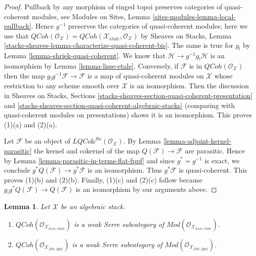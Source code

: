 \documentclass{stacks-project}
\theoremstyle{plain}
\newtheorem{lemma}[subsection]{Lemma}
\theoremstyle{definition}
\theoremstyle{remark}
\numberwithin{equation}{subsection}
\def\etale{{\acute{e}tale}}
\def\QCoh{\mathit{QCoh}}
\begin{document}
\begin{proof}
Pullback by any morphism of ringed topoi preserves categories of quasi-coherent
modules, see
Modules on Sites, Lemma \ref{sites-modules-lemma-local-pullback}.
Hence $g^{-1}$ preserves the categories of quasi-coherent modules;
here we use that
$\QCoh(\mathcal{O}_\mathcal{X}) =
\QCoh(\mathcal{X}_\etale, \mathcal{O}_\mathcal{X})$
by Sheaves on Stacks, Lemma
\ref{stacks-sheaves-lemma-characterize-quasi-coherent-bis}.
The same is true for $g_!$ by
Lemma \ref{lemma-shriek-quasi-coherent}.
We know that $\mathcal{H} \to g^{-1}g_!\mathcal{H}$ is an isomorphism by
Lemma \ref{lemma-lisse-etale}.
Conversely, if $\mathcal{F}$ is in $\QCoh(\mathcal{O}_\mathcal{X})$
then the map $g_!g^{-1}\mathcal{F} \to \mathcal{F}$ is a map of quasi-coherent
modules on $\mathcal{X}$ whose restriction to any scheme smooth over
$\mathcal{X}$ is an isomorphism. Then the discussion in
Sheaves on Stacks, Sections
\ref{stacks-sheaves-section-quasi-coherent-presentation} and
\ref{stacks-sheaves-section-quasi-coherent-algebraic-stacks}
(comparing with quasi-coherent modules on presentations)
shows it is an isomorphism. This proves (1)(a) and (2)(a).

\medskip\noindent
Let $\mathcal{F}$ be an object of
$\textit{LQCoh}^{fbc}(\mathcal{O}_\mathcal{X})$. By
Lemma \ref{lemma-adjoint-kernel-parasitic}
the kernel and cokernel of the map
$Q(\mathcal{F}) \to \mathcal{F}$ are parasitic. Hence by
Lemma \ref{lemma-parasitic-in-terms-flat-fppf}
and since $g^* = g^{-1}$ is exact, we conclude
$g^*Q(\mathcal{F}) \to g^*\mathcal{F}$ is an isomorphism. Thus
$g^*\mathcal{F}$ is quasi-coherent. This proves (1)(b) and (2)(b).
Finally, (1)(c) and (2)(c) follow because
$g_!g^*Q(\mathcal{F}) \to Q(\mathcal{F})$ is an isomorphism by
our arguments above.
\end{proof}

\begin{lemma}
\label{lemma-quasi-coherent-weak-serre}
Let $\mathcal{X}$ be an algebraic stack.
\begin{enumerate}
\item $\QCoh(\mathcal{O}_{\mathcal{X}_{lisse,\etale}})$
is a weak Serre subcategory of
$\textit{Mod}(\mathcal{O}_{\mathcal{X}_{lisse,\etale}})$.
\item $\QCoh(\mathcal{O}_{\mathcal{X}_{flat,fppf}})$
is a weak Serre subcategory of
$\textit{Mod}(\mathcal{O}_{\mathcal{X}_{flat,fppf}})$.
\end{enumerate}
\end{lemma}
\end{document}
